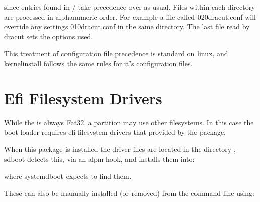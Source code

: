 \documentclass[letterpaper,11pt,english]{sphinxmanual}
\begin{document}
\begin{sphinxVerbatim}[commandchars=\\\{\}]
\end{sphinxVerbatim}

\sphinxAtStartPar
since entries found in / take precedence over  as usual.
Files within each directory are processed in alphanumeric order. For example a file called 020\sphinxhyphen{}dracut.conf
will over\sphinxhyphen{}ride any settings 010\sphinxhyphen{}dracut.conf in the same directory.
The last file read by dracut sets the options used.

\sphinxAtStartPar
This treatment of configuration file precedence is standard on linux, and kernel\sphinxhyphen{}install follows the
same rules for it’s configuration files.

\sphinxstepscope


\chapter{Efi Filesystem Drivers}
\label{\detokenize{Efi-Filesystem-Drivers:efi-filesystem-drivers}}\label{\detokenize{Efi-Filesystem-Drivers::doc}}
\sphinxAtStartPar
While the  is always Fat\sphinxhyphen{}32, a  partition may use other filesystems.
In this case the boot loader requires efi filesystem drivers that provided by the  package.

\sphinxAtStartPar
When this package is installed the driver files are located in the directory ,
sd\sphinxhyphen{}boot detects this, via an alpm hook, and installs them into:

\begin{sphinxVerbatim}[commandchars=\\\{\}]
\end{sphinxVerbatim}

\sphinxAtStartPar
where systemd\sphinxhyphen{}boot expects to find them.

\sphinxAtStartPar
These can also be manually installed (or removed) from the command line using:

\begin{sphinxVerbatim}[commandchars=\\\{\}]
 
\end{sphinxVerbatim}
\end{document}
